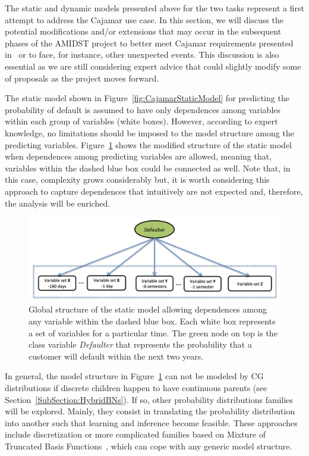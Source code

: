 The static and dynamic models presented above for the two tasks represent a first attempt to address the Cajamar use case. In this section, we will discuss the potential modifications and/or extensions that may occur in the subsequent phases of the AMIDST project to better meet Cajamar requirements presented in~\cite{Fer14b} or to face, for instance, other unexpected events. This discussion is also essential as we are still considering expert advice that could slightly modify some of proposals as the project moves forward.

The static model shown in Figure~\ref{fig:CajamarStaticModel} for predicting the probability of default is assumed to have only dependences among variables within each group of variables (white boxes). However, according to expert knowledge, no limitations should be imposed to the model structure among the predicting variables. Figure~\ref{fig:staticDependences} shows the modified structure of the static model when dependences among predicting variables are allowed, meaning that, variables within the dashed blue box could be connected as well. Note that, in this case, complexity grows considerably but, it is worth considering this approach to capture dependences that intuitively are not expected and, therefore, the analysis will be enriched.

\begin{figure}[ht!]
  \centering
\includegraphics[scale=0.4]{./figures/CajaMarModel3}
\caption{\label{fig:staticDependences}Global structure of the static model allowing dependences among any variable within the dashed blue box. Each white box represents a set of variables for a particular time. The green node on top is the class variable \emph{Defaulter} that represents the probability that a customer will default within the next two years.} 
\end{figure}

In general, the model structure in Figure~\ref{fig:staticDependences} can not be modeled by CG distributions if discrete children happen to have continuous parents (see Section~\ref{SubSection:HybridBNs}). If so, other probability distributions families will be explored. Mainly, they consist in translating the probability distribution into another such that learning and inference become feasible. These approaches include discretization or more complicated families based on Mixture of Truncated Basis Functions~\cite{Langseth12}, which can cope with any generic model structure.

